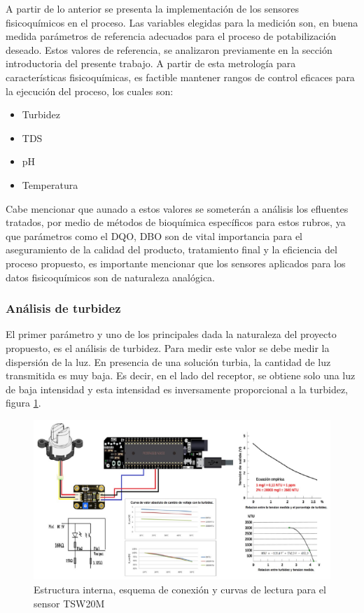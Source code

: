 \documentclass[conference]{IEEEtran}
\begin{document}
A partir de lo anterior se presenta la implementación de los sensores fisicoquímicos en el proceso. Las variables elegidas para la medición son, en buena medida parámetros de referencia adecuados para el proceso de potabilización deseado. Estos valores de referencia, se analizaron previamente en la sección introductoria del presente trabajo. A partir de esta metrología para características fisicoquímicas, es factible mantener rangos de control eficaces para la ejecución del proceso, los cuales son:


\begin{itemize}
	\item Turbidez
	\item TDS
	\item pH
	\item Temperatura
\end{itemize}

Cabe mencionar que aunado a estos valores se someterán a análisis los efluentes tratados, por medio de métodos de bioquímica específicos para estos rubros, ya que parámetros como el DQO, DBO son de vital importancia para el aseguramiento de la calidad del producto, tratamiento final y la eficiencia del proceso propuesto, es importante mencionar que los sensores aplicados para los datos fisicoquímicos son de naturaleza analógica.

\subsubsection{Análisis de turbidez}

El primer parámetro y uno de los principales dada la naturaleza del proyecto propuesto, es el análisis de turbidez. Para medir este valor se debe medir la dispersión de la luz. En presencia de una solución turbia, la cantidad de luz transmitida es muy baja. Es decir, en el lado del receptor, se obtiene solo una luz de baja intensidad y esta intensidad es inversamente proporcional a la turbidez, figura \ref{fig:12}.

\begin{figure}[htbp]
	\centering
	\includegraphics[width=0.9\columnwidth]{fig12.jpg}
	\caption{Estructura interna, esquema de conexión y curvas de lectura para el sensor TSW20M}
	\label{fig:12}
\end{figure}
\end{document}
